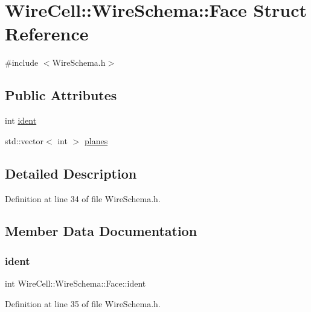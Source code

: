 \hypertarget{struct_wire_cell_1_1_wire_schema_1_1_face}{}\section{Wire\+Cell\+:\+:Wire\+Schema\+:\+:Face Struct Reference}
\label{struct_wire_cell_1_1_wire_schema_1_1_face}


{\ttfamily \#include $<$Wire\+Schema.\+h$>$}

\subsection*{Public Attributes}
\begin{DoxyCompactItemize}
\item 
int \hyperlink{struct_wire_cell_1_1_wire_schema_1_1_face_a55af671f3a685ee674256edf72adc33a}{ident}
\item 
std\+::vector$<$ int $>$ \hyperlink{struct_wire_cell_1_1_wire_schema_1_1_face_a62be3bcb043b68771e0bd5b6e4fc2607}{planes}
\end{DoxyCompactItemize}


\subsection{Detailed Description}


Definition at line 34 of file Wire\+Schema.\+h.



\subsection{Member Data Documentation}
\mbox{\label{struct_wire_cell_1_1_wire_schema_1_1_face_a55af671f3a685ee674256edf72adc33a}} 
\subsubsection{\texorpdfstring{ident}{ident}}
{\footnotesize\ttfamily int Wire\+Cell\+::\+Wire\+Schema\+::\+Face\+::ident}



Definition at line 35 of file Wire\+Schema.\+h.

